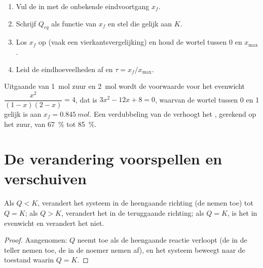 \begin{method}\label{met:g12:equilibrium:final}
\begin{enumerate}
  \item Vul de  in met de onbekende eindvoortgang $x_f$.
  \item Schrijf $Q_{eq}$ als functie van $x_f$ en stel die gelijk aan $K$.
  \item Los $x_f$ op (vaak een vierkantsvergelijking) en houd de wortel
        tussen 0 en $x_{\max}$.
  \item Leid de eindhoeveelheden af en $\tau = x_f/x_{\max}$.
\end{enumerate}
\end{method}

\begin{example}\label{ex:g12:equilibrium:excess}
Uitgaande van \qty{1}{mol} zuur en \qty{2}{mol}  wordt de voorwaarde
voor het evenwicht $\dfrac{x^2}{(1-x)(2-x)} = 4$, dat is $3x^2 - 12x + 8 = 0$, waarvan de
wortel tussen 0 en 1 gelijk is aan $x_f = \qty{0.845}{mol}$. Een
verdubbeling van de  verhoogt het , gerekend op het zuur,
van \qty{67}{\percent} tot
\qty{85}{\percent}.
\end{example}

\section{De verandering voorspellen en verschuiven}

\begin{proposition}\label{prop:g12:equilibrium:direction}
Als $Q < K$, verandert het systeem in de heengaande richting (de
 nemen toe) tot $Q = K$; als $Q > K$, verandert het in de
teruggaande richting; als $Q = K$, is het in evenwicht en verandert het
niet.
\end{proposition}

\begin{proof}
Aangenomen: $Q$ neemt toe als de heengaande reactie verloopt (de
 in de teller nemen toe, de  in de noemer
nemen af), en het systeem beweegt naar de toestand waarin $Q = K$.
\end{proof}

